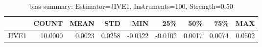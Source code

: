 \begin{table}[ht]
\centering
\caption{bias summary: Estimator=JIVE1, Instruments=100, Strength=0.50}
\begin{tabular}{lrrrrrrrr}
\toprule
 & COUNT & MEAN & STD & MIN & 25\% & 50\% & 75\% & MAX \\
\midrule
JIVE1 & 10.0000 & 0.0023 & 0.0258 & -0.0322 & -0.0102 & 0.0017 & 0.0074 & 0.0502 \\
\bottomrule
\end{tabular}
\end{table}
